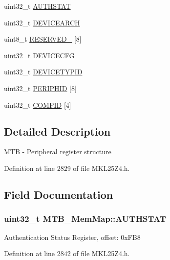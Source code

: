 \begin{DoxyCompactItemize}
uint32\+\_\+t \hyperlink{struct_m_t_b___mem_map_a5bc0007724226eb21df485ee381283e1}{A\+U\+T\+H\+S\+T\+AT}
\item 
uint32\+\_\+t \hyperlink{struct_m_t_b___mem_map_a64a9fe1c83fa72b2b38696ed80856b73}{D\+E\+V\+I\+C\+E\+A\+R\+CH}
\item 
uint8\+\_\+t \hyperlink{struct_m_t_b___mem_map_adaf45585328ad77c4b9c56ded53c3acc}{R\+E\+S\+E\+R\+V\+E\+D\+\_} \mbox{[}8\mbox{]}
\item 
uint32\+\_\+t \hyperlink{struct_m_t_b___mem_map_a85b25744edf0f8a61d1d40bdf636e87e}{D\+E\+V\+I\+C\+E\+C\+FG}
\item 
uint32\+\_\+t \hyperlink{struct_m_t_b___mem_map_ae15d7775b4603c2f81ab69dcd560c523}{D\+E\+V\+I\+C\+E\+T\+Y\+P\+ID}
\item 
uint32\+\_\+t \hyperlink{struct_m_t_b___mem_map_a1e121406a44ce4c5261292e960a86e29}{P\+E\+R\+I\+P\+H\+ID} \mbox{[}8\mbox{]}
\item 
uint32\+\_\+t \hyperlink{struct_m_t_b___mem_map_aad4a8dcad1e9b3d04375b85c6c37f09f}{C\+O\+M\+P\+ID} \mbox{[}4\mbox{]}
\end{DoxyCompactItemize}


\subsection{Detailed Description}
M\+TB -\/ Peripheral register structure 

Definition at line 2829 of file M\+K\+L25\+Z4.\+h.



\subsection{Field Documentation}
\subsubsection[{\texorpdfstring{A\+U\+T\+H\+S\+T\+AT}{AUTHSTAT}}]{\setlength{\rightskip}{0pt plus 5cm}uint32\+\_\+t M\+T\+B\+\_\+\+Mem\+Map\+::\+A\+U\+T\+H\+S\+T\+AT}\hypertarget{struct_m_t_b___mem_map_a5bc0007724226eb21df485ee381283e1}{}\label{struct_m_t_b___mem_map_a5bc0007724226eb21df485ee381283e1}
Authentication Status Register, offset\+: 0x\+F\+B8 

Definition at line 2842 of file M\+K\+L25\+Z4.\+h.

